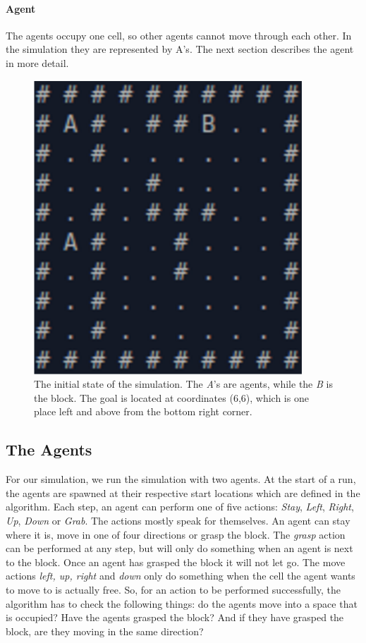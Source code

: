 \paragraph{Agent}
The agents occupy one cell, so other agents cannot move through each other. In the simulation they are represented by A's. The next section describes the agent in more detail. 

\begin{figure}
\begin{center}
\includegraphics[width=.35\textwidth]{images/environment.png}
\caption{The initial state of the simulation. The \textit{A}'s are agents, while the \textit{B} is the block. The goal is located at coordinates (6,6), which is one place left and above from the bottom right corner.}
\label{2}
\end{center}
\end{figure}

\subsection{The Agents}
For our simulation, we run the simulation with two agents. At the start of a run, the agents are spawned at their respective start locations which are defined in the algorithm. Each step, an agent can perform one of five actions: \textit{Stay}, \textit{Left}, \textit{Right}, \textit{Up}, \textit{Down} or \textit{Grab}. The actions mostly speak for themselves. An agent can stay where it is, move in one of four directions or grasp the block. The \textit{grasp} action can be performed at any step, but will only do something when an agent is next to the block. Once an agent has grasped the block it will not let go. The move actions \textit{left, up, right} and \textit{down} only do something when the cell the agent wants to move to is actually free. So, for an action to be performed successfully, the algorithm has to check the following things: do the agents move into a space that is occupied? Have the agents grasped the block? And if they have grasped the block, are they moving in the same direction? 


